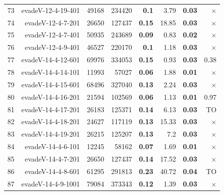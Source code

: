 \begin{longtable}{lrr@{\hskip 12pt}r@{\hskip 12pt}r@{\hskip 12pt}r@{\hskip 12pt}r@{\hskip 12pt}r}
73 & \multirow{1}{*}{evadeV-12-4-19-401} & \multirow{1}{*}{49168} & \multirow{1}{*}{234420} & \textbf{0.1} & 3.79 & \textbf{0.03} & $\times$ \\
74 & \multirow{1}{*}{evadeV-12-4-7-201} & \multirow{1}{*}{26650} & \multirow{1}{*}{127437} & \textbf{0.15} & 18.85 & \textbf{0.03} & $\times$ \\
75 & \multirow{1}{*}{evadeV-12-4-7-401} & \multirow{1}{*}{50935} & \multirow{1}{*}{243689} & \textbf{0.09} & 0.83 & \textbf{0.02} & $\times$ \\
76 & \multirow{1}{*}{evadeV-12-4-9-401} & \multirow{1}{*}{46527} & \multirow{1}{*}{220170} & \textbf{0.1} & 1.18 & \textbf{0.03} & $\times$ \\
77 & \multirow{1}{*}{evadeV-14-4-12-601} & \multirow{1}{*}{69976} & \multirow{1}{*}{334053} & \textbf{0.15} & 0.93 & \textbf{0.03} & 0.38 \\
78 & \multirow{1}{*}{evadeV-14-4-14-101} & \multirow{1}{*}{11993} & \multirow{1}{*}{57027} & \textbf{0.06} & 1.88 & \textbf{0.01} & $\times$ \\
79 & \multirow{1}{*}{evadeV-14-4-15-601} & \multirow{1}{*}{68496} & \multirow{1}{*}{327040} & \textbf{0.13} & 2.24 & \textbf{0.03} & $\times$ \\
80 & \multirow{1}{*}{evadeV-14-4-16-201} & \multirow{1}{*}{21594} & \multirow{1}{*}{102569} & \textbf{0.06} & 1.13 & \textbf{0.01} & 0.97 \\
81 & \multirow{1}{*}{evadeV-14-4-17-201} & \multirow{1}{*}{26183} & \multirow{1}{*}{125371} & \textbf{0.14} & 6.13 & \textbf{0.03} & TO \\
82 & \multirow{1}{*}{evadeV-14-4-18-201} & \multirow{1}{*}{24627} & \multirow{1}{*}{117119} & \textbf{0.13} & 15.33 & \textbf{0.03} & $\times$ \\
83 & \multirow{1}{*}{evadeV-14-4-19-201} & \multirow{1}{*}{26215} & \multirow{1}{*}{125207} & \textbf{0.13} & 7.2 & \textbf{0.03} & $\times$ \\
84 & \multirow{1}{*}{evadeV-14-4-6-101} & \multirow{1}{*}{12245} & \multirow{1}{*}{58162} & \textbf{0.07} & 1.69 & \textbf{0.01} & $\times$ \\
85 & \multirow{1}{*}{evadeV-14-4-7-201} & \multirow{1}{*}{26650} & \multirow{1}{*}{127437} & \textbf{0.14} & 17.52 & \textbf{0.03} & $\times$ \\
86 & \multirow{1}{*}{evadeV-14-4-8-601} & \multirow{1}{*}{61295} & \multirow{1}{*}{291813} & \textbf{0.23} & 40.72 & \textbf{0.04} & TO \\
87 & \multirow{1}{*}{evadeV-14-4-9-1001} & \multirow{1}{*}{79084} & \multirow{1}{*}{373343} & \textbf{0.12} & 1.39 & \textbf{0.03} & $\times$ \\

\end{longtable}
